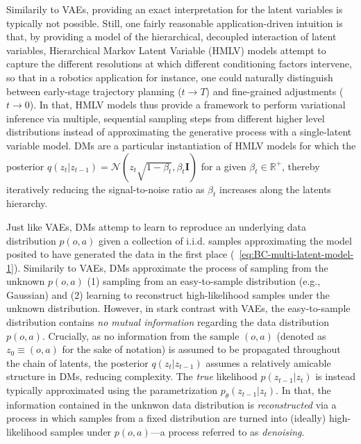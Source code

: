 Similarily to VAEs, providing an exact interpretation for the latent variables is typically not possible.
Still, one fairly reasonable application-driven intuition is that, by providing a model of the hierarchical, decoupled interaction of latent variables, Hierarchical Markov Latent Variable (HMLV) models attempt to capture the different resolutions at which different conditioning factors intervene, so that in a robotics application for instance, one could naturally distinguish between early-stage trajectory planning (\( t \to T\)) and fine-grained adjustments (\( t \to 0 \)).
In that, HMLV models thus provide a framework to perform variational inference via multiple, sequential sampling steps from different higher level distributions instead of approximating the generative process with a single-latent variable model.
DMs are a particular instantiation of HMLV models for which the posterior \( q( z_t \vert z_{t-1}) = \mathcal N(z_t \sqrt{1-\beta_t}, \beta_t \mathbf{I}) \) for a given \( \beta_t \in \mathbb R^+ \), thereby iteratively reducing the signal-to-noise ratio as \( \beta_t \) increases along the latents hierarchy.

Just like VAEs, DMs attemp to learn to reproduce an underlying data distribution \( p (o,a) \) given a collection of i.i.d. samples approximating the model posited to have generated the data in the first place (~\ref{eq:BC-multi-latent-model-1}).
Similarily to VAEs, DMs approximate the process of sampling from the unknown \( p(o,a) \) (1) sampling from an easy-to-sample distribution (e.g., Gaussian) and (2) learning to reconstruct high-likelihood samples under the unknown distribution.
However, in stark contrast with VAEs, the easy-to-sample distribution contains \emph{no mutual information} regarding the data distribution \( p(o,a) \).
Crucially, as no information from the sample \( (o,a) \) (denoted as \( z_0 \equiv (o,a) \) for the sake of notation) is assumed to be propagated throughout the chain of latents, the posterior \( q(z_t \vert z_{t-1})\) assumes a relatively amicable structure in DMs, reducing complexity.
The \emph{true} likelihood \( p(z_{t-1} \vert z_t) \) is instead typically approximated using the parametrization \(  p_\theta (z_{t-1} \vert z_t) \).
In that, the information contained in the unknwon data distribution is \emph{reconstructed} via a process in which samples from a fixed distribution are turned into (ideally) high-likelihood samples under \( p(o,a) \)---a process referred to as \emph{denoising}.

